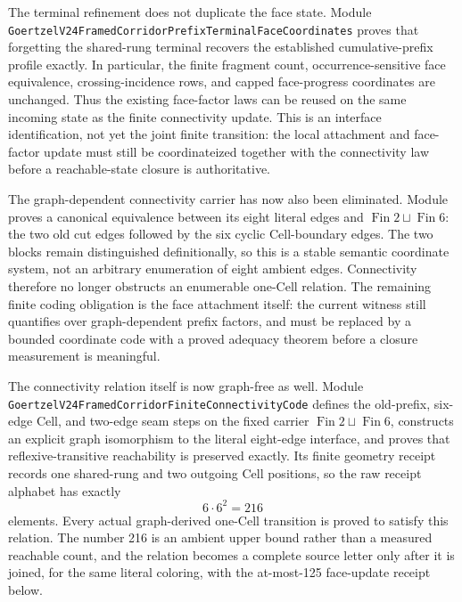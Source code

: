 \documentclass[11pt]{article}
\theoremstyle{definition}
\begin{document}
The terminal refinement does not duplicate the face state.  Module
\texttt{GoertzelV24FramedCorridorPrefixTerminalFaceCoordinates} proves that
forgetting the shared-rung terminal recovers the established cumulative-prefix
profile exactly.  In particular, the finite fragment count,
occurrence-sensitive face equivalence, crossing-incidence rows, and capped
face-progress coordinates are unchanged.  Thus the existing face-factor laws
can be reused on the same incoming state as the finite connectivity update.
This is an interface identification, not yet the joint finite transition: the
local attachment and face-factor update must still be coordinateized together
with the connectivity law before a reachable-state closure is authoritative.

The graph-dependent connectivity carrier has now also been eliminated.
Module
proves a canonical equivalence between its eight literal edges and
$\operatorname{Fin}2\mathbin{\sqcup}\operatorname{Fin}6$: the two old cut
edges followed by the six cyclic Cell-boundary edges.  The two blocks remain
distinguished definitionally, so this is a stable semantic coordinate system,
not an arbitrary enumeration of eight ambient edges.  Connectivity therefore
no longer obstructs an enumerable one-Cell relation.  The remaining finite
coding obligation is the face attachment itself: the current witness still
quantifies over graph-dependent prefix factors, and must be replaced by a
bounded coordinate code with a proved adequacy theorem before a closure
measurement is meaningful.

The connectivity relation itself is now graph-free as well.  Module
\texttt{GoertzelV24FramedCorridorFiniteConnectivityCode} defines the
old-prefix, six-edge Cell, and two-edge seam steps on the fixed carrier
$\operatorname{Fin}2\mathbin{\sqcup}\operatorname{Fin}6$, constructs an
explicit graph isomorphism to the literal eight-edge interface, and proves
that reflexive-transitive reachability is preserved exactly.  Its finite
geometry receipt records one shared-rung and two outgoing Cell positions, so
the raw receipt alphabet has exactly
\[
  6\cdot 6^2=216
\]
elements.  Every actual graph-derived one-Cell transition is proved to satisfy
this relation.  The number 216 is an ambient upper bound rather than a measured
reachable count, and the relation becomes a complete source letter only after
it is joined, for the same literal coloring, with the at-most-125 face-update
receipt below.
\end{document}
